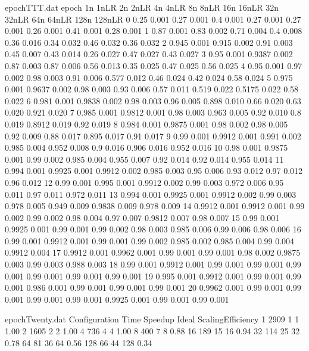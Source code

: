 \begin{filecontents}{epochTTT.dat}
epoch	1n	1nLR	2n	2nLR	4n	4nLR	8n	8nLR	16n	16nLR	32n	32nLR	64n	64nLR	128n	128nLR
0	0.25	0.001	0.27	0.001	0.4	0.001	0.27	0.001	0.27	0.001	0.26	0.001	0.41	0.001	0.28	0.001
1	0.87	0.001	0.83	0.002	0.71	0.004	0.4	0.008	0.36	0.016	0.34	0.032	0.46	0.032	0.36	0.032
2	0.945	0.001	0.915	0.002	0.91	0.003	0.45	0.007	0.43	0.014	0.26	0.027	0.47	0.027	0.43	0.027
3	0.95	0.001	0.9387	0.002	0.87	0.003	0.87	0.006	0.56	0.013	0.35	0.025	0.47	0.025	0.56	0.025
4	0.95	0.001	0.97	0.002	0.98	0.003	0.91	0.006	0.577	0.012	0.46	0.024	0.42	0.024	0.58	0.024
5	0.975	0.001	0.9637	0.002	0.98	0.003	0.93	0.006	0.57	0.011	0.519	0.022	0.5175	0.022	0.58	0.022
6	0.981	0.001	0.9838	0.002	0.98	0.003	0.96	0.005	0.898	0.010	0.66	0.020	0.63	0.020	0.921	0.020
7	0.985	0.001	0.9812	0.001	0.98	0.003	0.963	0.005	0.92	0.010	0.8	0.019	0.8912	0.019	0.92	0.019
8	0.984	0.001	0.9875	0.001	0.98	0.002	0.98	0.005	0.92	0.009	0.88	0.017	0.895	0.017	0.91	0.017
9	0.99	0.001	0.9912	0.001	0.991	0.002	0.985	0.004	0.952	0.008	0.9	0.016	0.906	0.016	0.952	0.016
10	0.98	0.001	0.9875	0.001	0.99	0.002	0.985	0.004	0.955	0.007	0.92	0.014	0.92	0.014	0.955	0.014
11	0.994	0.001	0.9925	0.001	0.9912	0.002	0.985	0.003	0.95	0.006	0.93	0.012	0.97	0.012	0.96	0.012
12	0.99	0.001	0.995	0.001	0.9912	0.002	0.99	0.003	0.972	0.006	0.95	0.011	0.97	0.011	0.972	0.011
13	0.994	0.001	0.9925	0.001	0.9912	0.002	0.99	0.003	0.978	0.005	0.949	0.009	0.9838	0.009	0.978	0.009
14	0.9912	0.001	0.9912	0.001	0.99	0.002	0.99	0.002	0.98	0.004	0.97	0.007	0.9812	0.007	0.98	0.007
15	0.99	0.001	0.9925	0.001	0.99	0.001	0.99	0.002	0.98	0.003	0.985	0.006	0.99	0.006	0.98	0.006
16	0.99	0.001	0.9912	0.001	0.99	0.001	0.99	0.002	0.985	0.002	0.985	0.004	0.99	0.004	0.9912	0.004
17	0.9912	0.001	0.9962	0.001	0.99	0.001	0.99	0.001	0.98	0.002	0.9875	0.003	0.99	0.003	0.988	0.003
18	0.99	0.001	0.9912	0.001	0.99	0.001	0.99	0.001	0.99	0.001	0.99	0.001	0.99	0.001	0.99	0.001
19	0.995	0.001	0.9912	0.001	0.99	0.001	0.99	0.001	0.986	0.001	0.99	0.001	0.99	0.001	0.99	0.001
20	0.9962	0.001	0.99	0.001	0.99	0.001	0.99	0.001	0.99	0.001	0.9925	0.001	0.99	0.001	0.99	0.001
\end{filecontents}
\begin{filecontents}{epochTwenty.dat}
Configuration	Time	Speedup	Ideal	ScalingEfficiency
1	2909	1	1	1.00
2	1605	2	2	1.00
4	736	4	4	1.00
8	400	7	8	0.88
16	189	15	16	0.94
32	114	25	32	0.78
64	81	36	64	0.56
128	66	44	128	0.34
\end{filecontents}